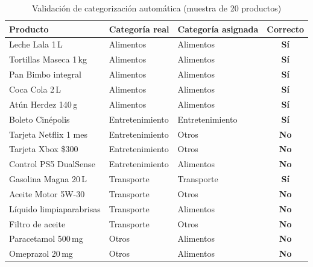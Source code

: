\begin{table}[H]
  \centering
  \small
  \caption{Validación de categorización automática (muestra de 20 productos)}
  \label{tab:validacion-categorias}
  \begin{tabular}{l l l c}
    \toprule
    \textbf{Producto} & \textbf{Categoría real} & \textbf{Categoría asignada} & \textbf{Correcto} \\
    \midrule
    Leche Lala 1\,L          & Alimentos       & Alimentos       & \textcolor{OliveGreen}{\textbf{Sí}} \\
    Tortillas Maseca 1\,kg   & Alimentos       & Alimentos       & \textcolor{OliveGreen}{\textbf{Sí}} \\
    Pan Bimbo integral       & Alimentos       & Alimentos       & \textcolor{OliveGreen}{\textbf{Sí}} \\
    Coca Cola 2\,L           & Alimentos       & Alimentos       & \textcolor{OliveGreen}{\textbf{Sí}} \\
    Atún Herdez 140\,g       & Alimentos       & Alimentos       & \textcolor{OliveGreen}{\textbf{Sí}} \\
    Boleto Cinépolis         & Entretenimiento & Entretenimiento & \textcolor{OliveGreen}{\textbf{Sí}} \\
    Tarjeta Netflix 1 mes    & Entretenimiento & Otros           & \textcolor{BrickRed}{\textbf{No}}   \\
    Tarjeta Xbox \$300       & Entretenimiento & Otros           & \textcolor{BrickRed}{\textbf{No}}   \\
    Control PS5 DualSense    & Entretenimiento & Alimentos       & \textcolor{BrickRed}{\textbf{No}}   \\
    Gasolina Magna 20\,L     & Transporte      & Transporte      & \textcolor{OliveGreen}{\textbf{Sí}} \\
    Aceite Motor 5W-30       & Transporte      & Otros           & \textcolor{BrickRed}{\textbf{No}}   \\
    Líquido limpiaparabrisas & Transporte      & Alimentos       & \textcolor{BrickRed}{\textbf{No}}   \\
    Filtro de aceite         & Transporte      & Otros           & \textcolor{BrickRed}{\textbf{No}}   \\
    Paracetamol 500\,mg      & Otros           & Alimentos       & \textcolor{BrickRed}{\textbf{No}}   \\
    Omeprazol 20\,mg         & Otros           & Alimentos       & \textcolor{BrickRed}{\textbf{No}}   \\

\end{tabular}
\end{table}
